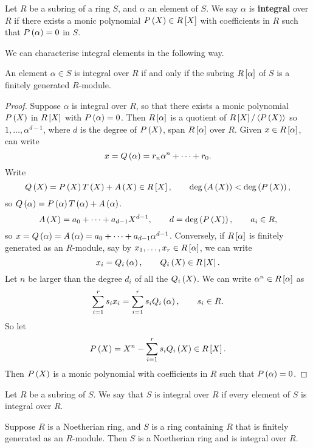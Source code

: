 \begin{definition}
Let $ R $ be a subring of a ring $ S $, and $ \alpha $ an element of $ S $. We say $ \alpha $ is \textbf{integral} over $ R $ if there exists a monic polynomial $ P\rb{X} \in R\sb{X} $ with coefficients in $ R $ such that $ P\rb{\alpha} = 0 $ in $ S $.
\end{definition}

We can characterise integral elements in the following way.

\begin{proposition}
An element $ \alpha \in S $ is integral over $ R $ if and only if the subring $ R\sb{\alpha} $ of $ S $ is a finitely generated $ R $-module.
\end{proposition}

\begin{proof}
Suppose $ \alpha $ is integral over $ R $, so that there exists a monic polynomial $ P\rb{X} $ in $ R\sb{X} $ with $ P\rb{\alpha} = 0 $. Then $ R\sb{\alpha} $ is a quotient of $ R\sb{X} / \ab{P\rb{X}} $ so $ 1, \dots, \alpha^{d - 1} $, where $ d $ is the degree of $ P\rb{X} $, span $ R\sb{\alpha} $ over $ R $. Given $ x \in R\sb{\alpha} $, can write
$$ x = Q\rb{\alpha} = r_n\alpha^n + \dots + r_0. $$
Write
$$ Q\rb{X} = P\rb{X}T\rb{X} + A\rb{X} \in R\sb{X}, \qquad \deg\rb{A\rb{X}} < \deg\rb{P\rb{X}}, $$
so $ Q\rb{\alpha} = P\rb{\alpha}T\rb{\alpha} + A\rb{\alpha} $.
$$ A\rb{X} = a_0 + \dots + a_{d - 1}X^{d - 1}, \qquad d = \deg\rb{P\rb{X}}, \qquad a_i \in R, $$
so $ x = Q\rb{\alpha} = A\rb{\alpha} = a_0 + \dots + a_{d - 1}\alpha^{d - 1} $. Conversely, if $ R\sb{\alpha} $ is finitely generated as an $ R $-module, say by $ x_1, \dots, x_r \in R\sb{\alpha} $, we can write
$$ x_i = Q_i\rb{\alpha}, \qquad Q_i\rb{X} \in R\sb{X}. $$
Let $ n $ be larger than the degree $ d_i $ of all the $ Q_i\rb{X} $. We can write $ \alpha^n \in R\sb{\alpha} $ as
$$ \sum_{i = 1}^r s_ix_i = \sum_{i = 1}^r s_iQ_i\rb{\alpha}, \qquad s_i \in R. $$
So let
$$ P\rb{X} = X^n - \sum_{i = 1}^r s_iQ_i\rb{X} \in R\sb{X}. $$
Then $ P\rb{X} $ is a monic polynomial with coefficients in $ R $ such that $ P\rb{\alpha} = 0 $.
\end{proof}

\begin{definition}
Let $ R $ be a subring of $ S $. We say that $ S $ is integral over $ R $ if every element of $ S $ is integral over $ R $.
\end{definition}

\begin{proposition}
Suppose $ R $ is a Noetherian ring, and $ S $ is a ring containing $ R $ that is finitely generated as an $ R $-module. Then $ S $ is a Noetherian ring and is integral over $ R $.
\end{proposition}

